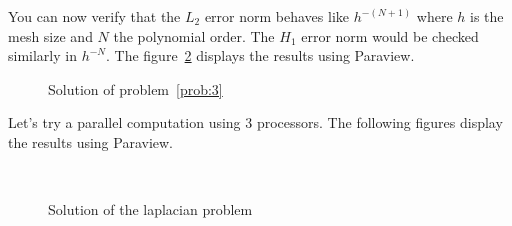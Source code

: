 You can now verify that the $L_2$ error norm behaves like $h^{-(N+1)}$
where $h$ is the mesh size and $N$ the polynomial order. The $H_1$
error norm would be checked similarly in $h^{-N}$. The
figure~\ref{fig:2} displays the results using Paraview.

\begin{figure}[!h]%
  \centering
  \caption{Solution of problem~\ref{prob:3}}
  \label{fig:2}
\end{figure}

Let's try a parallel computation using 3 processors. The following figures display the results using Paraview.
 \begin{figure}[!h]%
  \centering
  \\
  \caption{Solution of the laplacian problem}
  \label{fig:2}
\end{figure}


